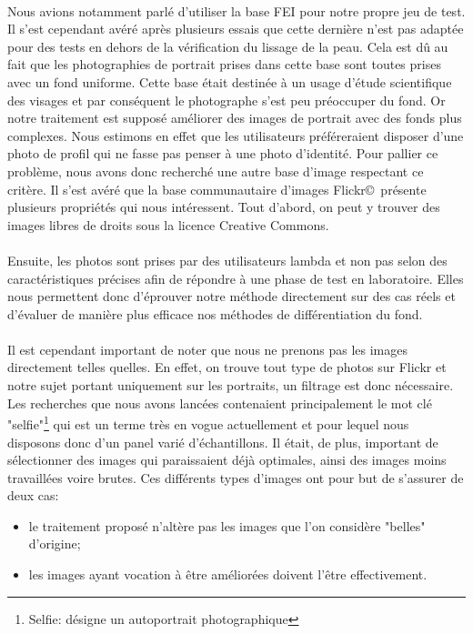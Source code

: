 \documentclass[11pt, french,screen]{report-rd-info}
\begin{document}
\paragraph*{}
Nous avions notamment parlé d'utiliser la base FEI pour notre propre jeu de test. Il s'est cependant avéré après plusieurs essais que cette dernière n'est pas adaptée pour des tests en dehors de la vérification du lissage de la peau. Cela est dû au fait que les photographies de portrait prises dans cette base sont toutes prises avec un fond uniforme. Cette base était destinée à un usage d'étude scientifique des visages et par conséquent le photographe s'est peu préoccuper du fond. Or notre traitement est supposé améliorer des images de portrait avec des fonds plus complexes. Nous estimons en effet que les utilisateurs préféreraient disposer d'une photo de profil qui ne fasse pas penser à une photo d'identité.
Pour pallier ce problème, nous avons donc recherché une autre base d'image respectant ce critère.
Il s'est avéré que la base communautaire d'images Flickr\copyright~présente plusieurs propriétés qui nous intéressent. Tout d'abord, on peut y trouver des images libres de droits sous la licence Creative Commons.
\paragraph*{}
Ensuite, les photos sont prises par des utilisateurs lambda et non pas selon des caractéristiques précises afin de répondre à une phase de test en laboratoire. Elles nous permettent donc d'éprouver notre méthode directement sur des cas réels et d'évaluer de manière plus efficace nos méthodes de différentiation du fond. 
\paragraph*{}
Il est cependant important de noter que nous ne prenons pas les images directement telles quelles. En effet, on trouve tout type de photos sur Flickr et notre sujet portant uniquement sur les portraits, un filtrage est donc nécessaire. Les recherches que nous avons lancées contenaient principalement le mot clé "selfie"\footnote{Selfie: désigne un autoportrait photographique} qui est un terme très en vogue actuellement et pour lequel nous disposons donc d'un panel varié d'échantillons. Il était, de plus, important de sélectionner des images qui paraissaient déjà optimales, ainsi des images moins travaillées voire brutes. Ces différents types d'images ont pour but de s'assurer de deux cas:
\begin{itemize}
\item le traitement proposé n'altère pas les images que l'on considère "belles" d'origine; 
\item les images ayant vocation à être améliorées doivent l'être effectivement.
\end{itemize}
\end{document}
